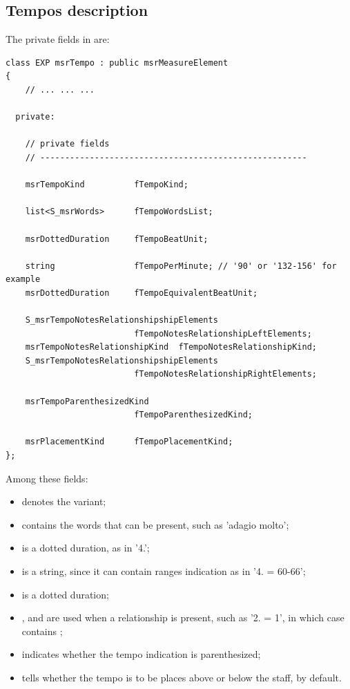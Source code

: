 \subsection{Tempos description}\label{Tempos description}

The private fields in  are:
\begin{lstlisting}[language=CPlusPlus]
class EXP msrTempo : public msrMeasureElement
{
	// ... ... ...

  private:

    // private fields
    // ------------------------------------------------------

    msrTempoKind          fTempoKind;

    list<S_msrWords>      fTempoWordsList;

    msrDottedDuration     fTempoBeatUnit;

    string                fTempoPerMinute; // '90' or '132-156' for example
    msrDottedDuration     fTempoEquivalentBeatUnit;

    S_msrTempoNotesRelationshipshipElements
                          fTempoNotesRelationshipLeftElements;
    msrTempoNotesRelationshipKind  fTempoNotesRelationshipKind;
    S_msrTempoNotesRelationshipshipElements
                          fTempoNotesRelationshipRightElements;

    msrTempoParenthesizedKind
                          fTempoParenthesizedKind;

    msrPlacementKind      fTempoPlacementKind;
};
\end{lstlisting}

Among these fields:
\begin{itemize}
\item {} denotes the variant;
\item {} contains the words that can be present, such as 'adagio molto';
\item {} is a dotted duration, as in '4.';
\item {} is a string, since it can contain ranges indication as in '4. = 60-66';
\item {} is a dotted duration; %
\item {},  and  are used when a relationship is present, such as '2. = 1', in which case  contains ;
\item {} indicates whether the tempo indication is parenthesized;
\item {} tells whether the tempo is to be places above or below the staff,  by default.
\end{itemize}


